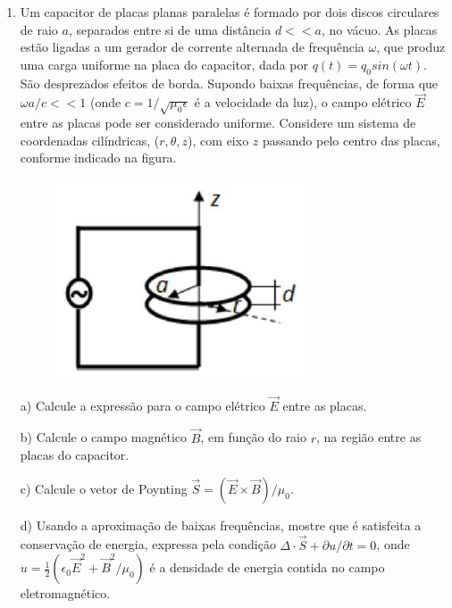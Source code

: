\begin{enumerate}[start=1,label={\bfseries Q\arabic*.}]
\resposta



\item Um capacitor de placas planas paralelas é formado por dois discos circulares de raio $a$, separados entre si de uma distância $d << a$, no vácuo. As placas estão ligadas a um gerador de corrente alternada de frequência $\omega$, que produz uma carga uniforme na placa do capacitor, dada por $q(t) = q_{0} sin(\omega t)$. São desprezados efeitos de borda. Supondo baixas frequências, de forma que $\omega a/c << 1$ (onde $c = 1/\sqrt{\mu_{0} \epsilon}$ é a velocidade da luz), o campo elétrico $\vec{E}$ entre as placas pode ser considerado uniforme. Considere um sistema de coordenadas cilíndricas, ($r,\theta,z$), com eixo $z$ passando pelo centro das placas, conforme indicado na figura.

\begin{figure}[H]
\centering
\includegraphics[scale=0.8]{eletromag-img/paralela.png}
\end{figure}


a) Calcule a expressão para o campo elétrico $\vec{E}$ entre as placas.

\resposta

b) Calcule o campo magnético $\vec{B}$, em função do raio $r$, na região entre as placas do capacitor.

\resposta

c) Calcule o vetor de Poynting $\vec{S} = (\vec{E} \times \vec{B} )/\mu_{0}$.

\resposta

d) Usando a aproximação de baixas frequências, mostre que é satisfeita a conservação de energia, expressa pela condição $\Delta \cdot \vec{S} + \partial u / \partial t = 0 $, onde $u = \frac{1}{2} ( \epsilon_{0} \vec{E}^{2} + \vec{B}^{2}/\mu_{0} )$ é a densidade de energia contida no campo eletromagnético.

\resposta



\end{enumerate}
